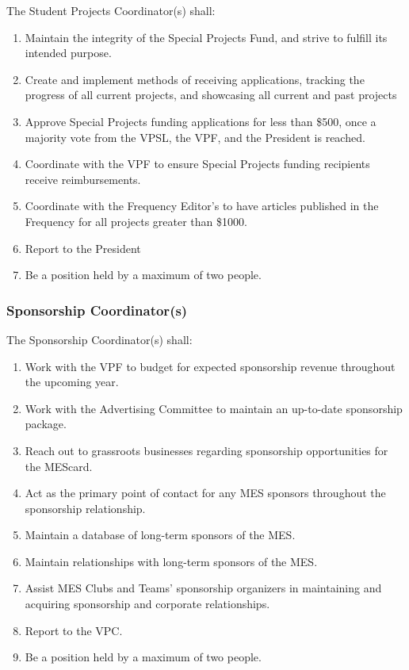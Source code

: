 The Student Projects Coordinator(s) shall:
\begin{enumerate}
 \item
  Maintain the integrity of the Special Projects Fund, and strive to fulfill its intended purpose.
 \item
  Create and implement methods of receiving applications, tracking the progress of all current projects, and showcasing all current and past projects
 \item
  Approve Special Projects funding applications for less than \$500, once a majority vote from the VPSL, the VPF, and the President is reached.
 \item
  Coordinate with the VPF to ensure Special Projects funding recipients receive reimbursements.
 \item
  Coordinate with the Frequency Editor's to have articles published in the Frequency for all projects greater than \$1000.
 \item
  Report to the President
 \item
  Be a position held by a maximum of two people.

\end{enumerate}

\subsubsection{Sponsorship Coordinator(s)}
\label{sponsorship-coordinators}
The Sponsorship Coordinator(s) shall:

\begin{enumerate}
 \item
  Work with the VPF to budget for expected sponsorship revenue throughout the upcoming year.
 \item
  Work with the Advertising Committee to maintain an up-to-date sponsorship package.
 \item
  Reach out to grassroots businesses regarding sponsorship opportunities for the MEScard.
 \item
  Act as the primary point of contact for any MES sponsors throughout the sponsorship relationship.
 \item
  Maintain a database of long-term sponsors of the MES.
 \item
  Maintain relationships with long-term sponsors of the MES.
 \item
  Assist MES Clubs and Teams' sponsorship organizers in maintaining and acquiring sponsorship and corporate relationships.
 \item
  Report to the VPC.
 \item
  Be a position held by a maximum of two people.
\end{enumerate}


